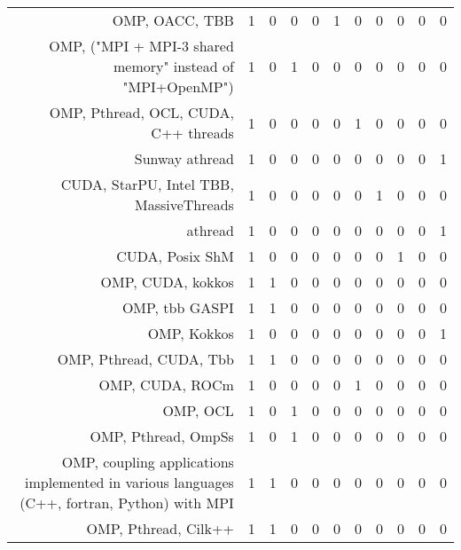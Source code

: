 {\begin{landscape}
\begin{longtable}[htb]{r|c|c|c|c|c|c|c|c|c|c}
{OMP, OACC, TBB} & 1 & 0 & 0 & 0 & 1 & 0 & 0 & 0 & 0 & 0 \\%
{OMP, ("MPI + MPI-3 shared memory" instead of "MPI+OpenMP")} & 1 & 0 & 1 & 0 & 0 & 0 & 0 & 0 & 0 & 0 \\%
{OMP, Pthread, OCL, CUDA, C++ threads} & 1 & 0 & 0 & 0 & 0 & 1 & 0 & 0 & 0 & 0 \\%
{Sunway athread} & 1 & 0 & 0 & 0 & 0 & 0 & 0 & 0 & 0 & 1 \\%
{CUDA, StarPU, Intel TBB, MassiveThreads} & 1 & 0 & 0 & 0 & 0 & 0 & 1 & 0 & 0 & 0 \\%
{athread} & 1 & 0 & 0 & 0 & 0 & 0 & 0 & 0 & 0 & 1 \\%
{CUDA, Posix ShM} & 1 & 0 & 0 & 0 & 0 & 0 & 0 & 1 & 0 & 0 \\%
{OMP, CUDA, kokkos} & 1 & 1 & 0 & 0 & 0 & 0 & 0 & 0 & 0 & 0 \\%
{OMP, tbb GASPI} & 1 & 1 & 0 & 0 & 0 & 0 & 0 & 0 & 0 & 0 \\%
{OMP, Kokkos} & 1 & 0 & 0 & 0 & 0 & 0 & 0 & 0 & 0 & 1 \\%
{OMP, Pthread, CUDA, Tbb} & 1 & 1 & 0 & 0 & 0 & 0 & 0 & 0 & 0 & 0 \\%
{OMP, CUDA, ROCm} & 1 & 0 & 0 & 0 & 0 & 1 & 0 & 0 & 0 & 0 \\%
{OMP, OCL} & 1 & 0 & 1 & 0 & 0 & 0 & 0 & 0 & 0 & 0 \\%
{OMP, Pthread, OmpSs} & 1 & 0 & 1 & 0 & 0 & 0 & 0 & 0 & 0 & 0 \\%
{OMP, coupling applications implemented in various languages (C++, fortran, Python) with MPI} & 1 & 1 & 0 & 0 & 0 & 0 & 0 & 0 & 0 & 0 \\%
{OMP, Pthread, Cilk++} & 1 & 1 & 0 & 0 & 0 & 0 & 0 & 0 & 0 & 0 \\%
\hline%
\end{longtable}%
\end{landscape}}%
\clearpage%
